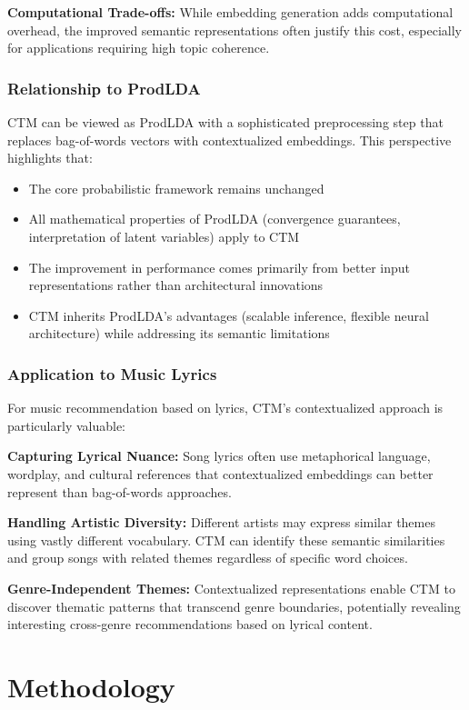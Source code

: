 \documentclass[12pt]{article}
\begin{document}
\textbf{Computational Trade-offs:} While embedding generation adds computational overhead, the improved semantic representations often justify this cost, especially for applications requiring high topic coherence.

\subsubsection{Relationship to ProdLDA}
CTM can be viewed as ProdLDA with a sophisticated preprocessing step that
replaces bag-of-words vectors with contextualized embeddings. This perspective
highlights that:

\begin{itemize}
    \item The core probabilistic framework remains unchanged
    \item All mathematical properties of ProdLDA (convergence guarantees, interpretation
          of latent variables) apply to CTM
    \item The improvement in performance comes primarily from better input
          representations rather than architectural innovations
    \item CTM inherits ProdLDA's advantages (scalable inference, flexible neural
          architecture) while addressing its semantic limitations
\end{itemize}

\subsubsection{Application to Music Lyrics}
For music recommendation based on lyrics, CTM's contextualized approach is
particularly valuable:

\textbf{Capturing Lyrical Nuance:} Song lyrics often use metaphorical language, wordplay, and cultural references that contextualized embeddings can better represent than bag-of-words approaches.

\textbf{Handling Artistic Diversity:} Different artists may express similar themes using vastly different vocabulary. CTM can identify these semantic similarities and group songs with related themes regardless of specific word choices.

\textbf{Genre-Independent Themes:} Contextualized representations enable CTM to discover thematic patterns that transcend genre boundaries, potentially revealing interesting cross-genre recommendations based on lyrical content.

\section{Methodology}
\end{document}
